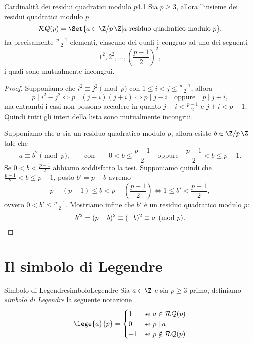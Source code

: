 \begin{teor}{Cardinalità dei residui quadratici modulo \(p\)}{4.1}
	Sia \(p\ge 3\), allora l'insieme dei residui quadratici modulo \(p\)
	\[
		\mathcal{RQ}(p) = \Set{a \in \Z/p\,\Z | a \text{ residuo quadratico modulo }p},
	\]
	ha precisamente \(\frac{p-1}{2}\) elementi, ciascuno dei quali è congruo ad uno dei seguenti
	\[
		1^2,2^2,\ldots,\left( \frac{p-1}{2} \right)^2,
	\]
	i quali sono mutualmente incongrui.
\end{teor}
%
%
\begin{proof}
	Supponiamo che \(i^2 \equiv j^2 \pmod{p}\) con \(1 \le i<j \le \frac{p-1}{2}\), allora
	\[
		p \mid i^2-j^2 \iff p \mid (j-i)(j+i) \iff p\mid j-i \quad\text{oppure}\quad p\mid j+i,
	\]
	ma entrambi i casi non possono accadere in quanto \(j-i<\frac{p-1}{2}\) e \(j+i<p-1\).
	Quindi tutti gli interi della lista sono mutualmente incongrui.

	Supponiamo che \(a\) sia un residuo quadratico modulo \(p\), allora esiste \(b\in\Z/p\,\Z\) tale che
	\[
		a \equiv b^2 \pmod{p},\qquad\text{con}\qquad 0<b\le \frac{p-1}{2}\quad\text{oppure}\quad \frac{p-1}{2}<b \le p-1.
	\]
	Se \(0<b<\frac{p-1}{2}\) abbiamo soddisfatto la tesi.
	Supponiamo quindi che \(\frac{p-1}{2} < b \le p-1\), posto \(b'=p-b\) avremo
	\[
		p-(p-1) \le b < p- \left( \frac{p-1}{2} \right) \iff 1 \le b' < \frac{p+1}{2},
	\]
	ovvero \(0 < b' \le \frac{p-1}{2}\).
	Mostriamo infine che \(b'\) è un residuo quadratico modulo \(p\):
	\[
		b'^2 =(p-b)^2 \equiv (-b)^2 \equiv a \pmod{p}.\qedhere
	\]
\end{proof}
\section{Il simbolo di Legendre}

\begin{defn}{Simbolo di Legendre}{simboloLegendre}
	Sia \(a\in\Z\) e sia \(p\ge 3\) primo, definiamo \emph{simbolo di Legendre} la seguente notazione
	\[
		\lege{a}{p} = 	\begin{cases}
			1  & \text{se }a\in\mathcal{RQ}(p)    \\
			0  & \text{se }p\mid a                \\
			-1 & \text{se }p\notin\mathcal{RQ}(p)
		\end{cases}
	\]
\end{defn}

